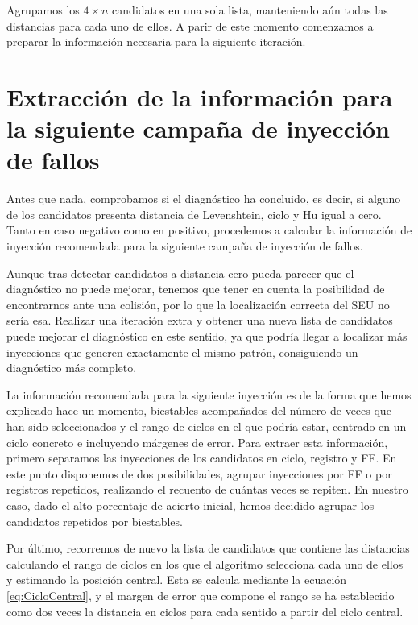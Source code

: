 Agrupamos los $4 \times n$ candidatos en una sola lista, manteniendo aún todas las
distancias para cada uno de ellos. A parir de este momento comenzamos a preparar
la información necesaria para la siguiente iteración.


\section{Extracción de la información para la siguiente campaña de inyección de
fallos}
\label{sec:InfoCampana}
Antes que nada, comprobamos si el diagnóstico
ha concluido, es decir, si alguno de los candidatos presenta distancia de
Levenshtein, ciclo y Hu igual a cero. Tanto en caso negativo como en positivo, 
procedemos a calcular la información de inyección recomendada para la siguiente 
campaña de inyección de fallos.

Aunque tras detectar candidatos a distancia cero pueda parecer que el diagnóstico
no puede mejorar, tenemos que tener en cuenta la posibilidad de encontrarnos ante
una colisión, por lo que la localización correcta del \gls{SEU} no sería esa.
Realizar una iteración extra y obtener una nueva lista de candidatos puede mejorar
el diagnóstico en este sentido, ya que podría llegar a localizar más inyecciones
que generen exactamente el mismo patrón, consiguiendo un diagnóstico más completo.

La información recomendada para la siguiente inyección es de la forma que hemos
explicado hace un momento, biestables acompañados del número de veces que han sido
seleccionados y el rango de ciclos en el que podría estar, centrado en un ciclo
concreto e incluyendo márgenes de error. Para extraer esta información, primero
separamos las inyecciones de los candidatos en ciclo, registro y \gls{FF}. En este
punto disponemos de dos posibilidades, agrupar inyecciones por \gls{FF} o por
registros repetidos, realizando el recuento de cuántas veces se repiten. En 
nuestro caso, dado el alto porcentaje de acierto inicial, hemos decidido agrupar 
los candidatos repetidos por biestables.

Por último, recorremos de nuevo la lista de candidatos que contiene las
distancias calculando el rango de ciclos en los que el algoritmo selecciona cada
uno de ellos y estimando la posición central. Esta se calcula mediante la ecuación
\ref{eq:CicloCentral}, y el margen de error que compone el rango se ha establecido
como dos veces la distancia en ciclos para cada sentido a partir del ciclo central.

